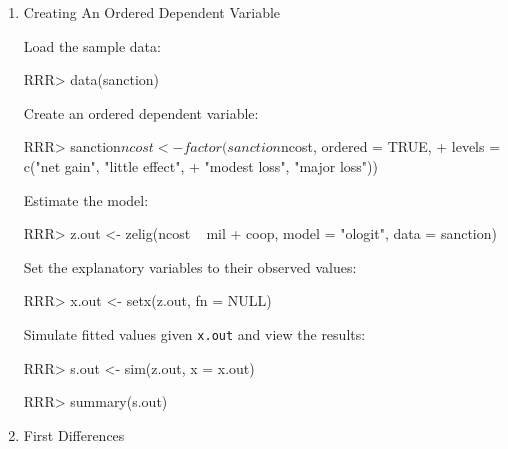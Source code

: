 \begin{enumerate}

\item {Creating An Ordered Dependent Variable} \label{ord.fact}

Load the sample data:  
\begin{Schunk}
\begin{Sinput}
RRR>  data(sanction)
\end{Sinput}
\end{Schunk}
Create an ordered dependent variable: 
\begin{Schunk}
\begin{Sinput}
RRR>  sanction$ncost <- factor(sanction$ncost, ordered = TRUE,
+                           levels = c("net gain", "little effect", 
+                           "modest loss", "major loss"))
\end{Sinput}
\end{Schunk}
Estimate the model:
\begin{Schunk}
\begin{Sinput}
RRR>  z.out <- zelig(ncost ~ mil + coop, model = "ologit", data = sanction)
\end{Sinput}
\end{Schunk}
Set the explanatory variables to their observed values:  
\begin{Schunk}
\begin{Sinput}
RRR>  x.out <- setx(z.out, fn = NULL)
\end{Sinput}
\end{Schunk}
Simulate fitted values given {\tt x.out} and view the results:
\begin{Schunk}
\begin{Sinput}
RRR>  s.out <- sim(z.out, x = x.out)
\end{Sinput}
\end{Schunk}
\begin{Schunk}
\begin{Sinput}
RRR>  summary(s.out)
\end{Sinput}
\end{Schunk}

\item {First Differences}


\end{enumerate}
